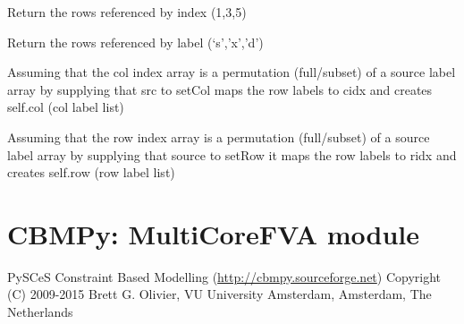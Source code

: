\documentclass[a4paper,11pt,english]{sphinxmanual}
\begin{document}
\begin{fulllineitems}
\begin{fulllineitems}
\label{modules_doc:cbmpy.PyscesStoich.StructMatrix.getRowsByIdx}
Return the rows referenced by index (1,3,5)

\end{fulllineitems}


\begin{fulllineitems}
\label{modules_doc:cbmpy.PyscesStoich.StructMatrix.getRowsByName}
Return the rows referenced by label (`s','x','d')

\end{fulllineitems}


\begin{fulllineitems}
\label{modules_doc:cbmpy.PyscesStoich.StructMatrix.setCol}
Assuming that the col index array is a permutation (full/subset)
of a source label array by supplying that src to setCol
maps the row labels to cidx and creates self.col (col label list)

\end{fulllineitems}


\begin{fulllineitems}
\label{modules_doc:cbmpy.PyscesStoich.StructMatrix.setRow}
Assuming that the row index array is a permutation (full/subset)
of a source label array by supplying that source to setRow it
maps the row labels to ridx and creates self.row (row label list)

\end{fulllineitems}


\end{fulllineitems}

\label{modules_doc:module-cbmpy._multicorefva}

\section{CBMPy: MultiCoreFVA module}
\label{modules_doc:cbmpy-multicorefva-module}
PySCeS Constraint Based Modelling (\href{http://cbmpy.sourceforge.net}{http://cbmpy.sourceforge.net})
Copyright (C) 2009-2015 Brett G. Olivier, VU University Amsterdam, Amsterdam, The Netherlands
\end{document}
